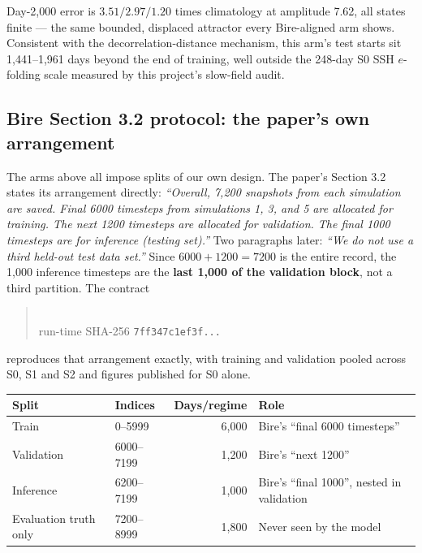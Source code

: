\documentclass[11pt]{article}
\begin{document}
Day-2{,}000 error is \(3.51/2.97/1.20\) times climatology at amplitude 7.62, all
states finite --- the same bounded, displaced attractor every Bire-aligned arm
shows.  Consistent with the decorrelation-distance mechanism, this arm's test
starts sit 1{,}441--1{,}961 days beyond the end of training, well outside the
248-day S0 SSH \(e\)-folding scale measured by this project's slow-field audit.

\subsection{Bire Section 3.2 protocol: the paper's own arrangement}

The arms above all impose splits of our own design.  The paper's Section 3.2
states its arrangement directly: \emph{``Overall, 7{,}200 snapshots from each
simulation are saved.  Final 6000 timesteps from simulations 1, 3, and 5 are
allocated for training.  The next 1200 timesteps are allocated for validation.
The final 1000 timesteps are for inference (testing set).''}  Two paragraphs
later: \emph{``We do not use a third held-out test data set.''}  Since
\(6000+1200=7200\) is the entire record, the 1{,}000 inference timesteps are the
\textbf{last 1{,}000 of the validation block}, not a third partition.  The
contract
\begin{quote}
\\
run-time SHA-256 \texttt{7ff347c1ef3f...}
\end{quote}
reproduces that arrangement exactly, with training and validation pooled across
S0, S1 and S2 and figures published for S0 alone.

\begin{center}\small
\begin{tabular}{@{}llrl@{}}
\toprule
\textbf{Split} & \textbf{Indices} & \textbf{Days/regime} & \textbf{Role} \\
\midrule
Train & 0--5999 & 6{,}000 & Bire's ``final 6000 timesteps'' \\
Validation & 6000--7199 & 1{,}200 & Bire's ``next 1200'' \\
Inference & 6200--7199 & 1{,}000 & Bire's ``final 1000'', nested in validation \\
\midrule
Evaluation truth only & 7200--8999 & 1{,}800 & Never seen by the model \\
\bottomrule
\end{tabular}
\end{center}
\end{document}
